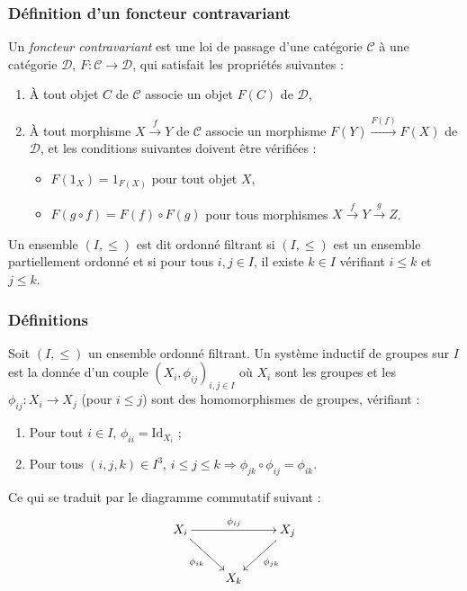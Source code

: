 \documentclass[9pt]{beamer}
\begin{document}
\begin{frame}
	\frametitle{Définition d'un foncteur contravariant}
	
	\begin{definition}
Un \textit{foncteur contravariant} est une loi de passage d'une catégorie \( \mathcal{C} \) à une catégorie \( \mathcal{D} \), \( F : \mathcal{C} \to \mathcal{D} \), qui satisfait les propriétés suivantes :
		\begin{enumerate}[label=\roman*)]
			\item À tout objet \( C \) de \( \mathcal{C} \) associe un objet \( F(C) \) de \( \mathcal{D} \),
			\item À tout morphisme \( X \xrightarrow{f} Y \) de \( \mathcal{C} \) associe un morphisme \( F(Y) \xrightarrow{F(f)} F(X) \) de \( \mathcal{D} \), et les conditions suivantes doivent être vérifiées :
			\begin{itemize}
				\item \( F(1_X) = 1_{F(X)} \) pour tout objet \( X \),
				\item \( F(g \circ f) = F(f) \circ F(g) \) pour tous morphismes \( X \xrightarrow{f} Y \xrightarrow{g} Z \).
			\end{itemize}
		\end{enumerate}
	\end{definition}
	
\begin{definition} 
Un ensemble \((I, \leq)\) est dit ordonné filtrant si \((I, \leq)\) est un ensemble partiellement ordonné et si pour tous \(i, j \in I\), il existe \(k \in I\) vérifiant \(i \leq k\) et \(j \leq k\).
\end{definition}
	
\end{frame}


\begin{frame}
	\frametitle{Définitions}
	
	\begin{definition}
Soit \((I, \leq)\) un ensemble ordonné filtrant. Un système inductif de groupes sur \(I\) est la donnée d'un couple \((X_i, \phi_{ij})_{i,j \in I}\) où \(X_i\) sont les groupes et les \(\phi_{ij} : X_i \to X_j\) (pour \(i \leq j\)) sont des homomorphismes de groupes, vérifiant :
	\begin{enumerate}[label=\roman*)]
		\item Pour tout \(i \in I\), \(\phi_{ii} = \mathrm{Id}_{X_i}\) ;
		\item Pour tous \((i, j, k) \in I^3\), \(i \leq j \leq k \Rightarrow \phi_{jk} \circ \phi_{ij} = \phi_{ik}\).
	\end{enumerate}
Ce qui se traduit par le diagramme commutatif suivant :
	\[
	\xymatrix{
		X_i \ar[rr]^{\phi_{ij}} \ar[dr]_{\phi_{ik}} & & X_j \ar[dl]^{\phi_{jk}} \\
		& X_k &
	}
	\]
\end{definition}
	
\end{frame}
\end{document}
